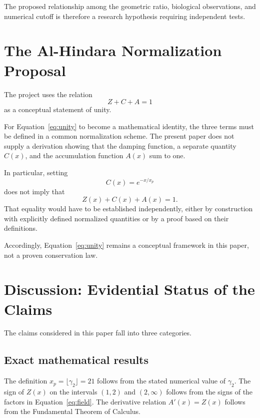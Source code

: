 \documentclass[11pt,a4paper]{article}
\begin{document}
The proposed relationship among the geometric ratio,
biological observations, and numerical cutoff is therefore
a research hypothesis requiring independent tests.

\section{The Al-Hindara Normalization Proposal}

The project uses the relation
\begin{equation}
Z+C+A=1
\label{eq:unity}
\end{equation}
as a conceptual statement of unity.

For Equation~\eqref{eq:unity} to become a mathematical
identity, the three terms must be defined in a common
normalization scheme. The present paper does not supply a
derivation showing that the damping function, a separate
quantity \(C(x)\), and the accumulation function \(A(x)\)
sum to one.

In particular, setting
\[
C(x)=e^{-x/x_p}
\]
does not imply that
\[
Z(x)+C(x)+A(x)=1.
\]
That equality would have to be established independently,
either by construction with explicitly defined normalized
quantities or by a proof based on their definitions.

Accordingly, Equation~\eqref{eq:unity} remains a conceptual
framework in this paper, not a proven conservation law.

\section{Discussion: Evidential Status of the Claims}

The claims considered in this paper fall into three categories.

\subsection*{Exact mathematical results}

The definition \(x_p=\lfloor\gamma_2\rfloor=21\) follows from
the stated numerical value of \(\gamma_2\). The sign of
\(Z(x)\) on the intervals \((1,2)\) and \((2,\infty)\) follows
from the signs of the factors in Equation~\eqref{eq:field}.
The derivative relation \(A'(x)=Z(x)\) follows from the
Fundamental Theorem of Calculus.
\end{document}
